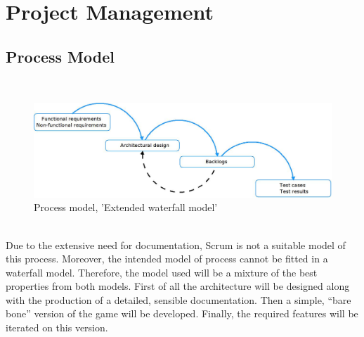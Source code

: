 \chapter{Project Management}

\section{Process Model}
\\
\begin{figure}[H]
  \centering
    \includegraphics[width=1.0\textwidth]{img/waterfall.jpeg}
  \caption{Process model, 'Extended waterfall model'} 
  \label{fig:exwaterfall}
\end{figure}
\\

Due to the extensive need for documentation, Scrum is not a suitable model of 
this process. Moreover, the intended model of process cannot be fitted in a 
waterfall model. Therefore, the model used will be a mixture of the best 
properties from both models. First of all the architecture will be designed 
along with the production of a detailed, sensible documentation. Then a simple, 
“bare bone” version of the game will be developed. Finally, the required 
features will be iterated on this version.


